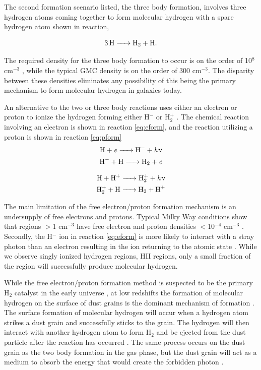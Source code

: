 The second formation scenario listed, the three body formation, involves three hydrogen atoms coming together to form molecular hydrogen with a spare hydrogen atom shown in reaction,

\begin{equation}\label{eq:3bod}
  \ce{3H -> H_2 + H}.
\end{equation}

The required density for the three body formation to occur is on the order of 10$^8$ cm$^{-3}$ \citep{palla1983,abel1997}, while the typical GMC density is on the order of 300 cm$^{-3}$.  The disparity between these densities eliminates any possibility of this being the primary mechanism to form molecular hydrogen in galaxies today. 

An alternative to the two or three body reactions uses either an electron or proton to ionize the hydrogen forming either H$^-$ or H$_2^+$ \citep{krumholz2014}.  The chemical reaction involving an electron is shown in reaction \ref{eq:eform}, and the reaction utilizing a proton is shown in reaction \ref{eq:pform}
\begin{equation}\label{eq:eform}
  \begin{split}
    \ce{H + \it{e} -> H^- + \it{h\nu}} \\
    \ce{H^- + H -> H_2 + \it{e}}
  \end{split}
\end{equation}

\begin{equation}\label{eq:pform}
  \begin{split}
    \ce{H + H^+ -> H^+_2 + \it{h\nu}} \\
    \ce{H^+_2 + H -> H_2 + H^+}
  \end{split}
\end{equation}

The main limitation of the free electron/proton formation mechanism is an undersupply of free electrons and protons.  Typical Milky Way conditions show that regions $>$1 cm$^{-3}$ have free electron and proton densities $<$10$^{-4}$ cm$^{-3}$ \citep{wolfire2003}.  Secondly, the H$^-$ ion in reaction \ref{eq:eform} is more likely to interact with a stray photon than an electron resulting in the ion returning to the atomic state \citep{glover2003}.  While we observe singly ionized hydrogen regions, HII regions, only a small fraction of the region will successfully produce molecular hydrogen.

While the free electron/proton formation method is suspected to be the primary H$_2$ catalyst in the early universe \citep{herbst2005}, at low redshifts the formation of molecular hydrogen on the surface of dust grains is the dominant mechanism of formation \citep{krumholz2014}.  The surface formation of molecular hydrogen will occur when a hydrogen atom strikes a dust grain and successfully sticks to the grain.  The hydrogen will then interact with another hydrogen atom to form H$_2$ and be ejected from the dust particle after the reaction has occurred \citep{pirronello1997}.  The same process occurs on the dust grain as the two body formation in the gas phase, but  the dust grain will act as a medium to absorb the energy that would create the forbidden photon \citep{krumholz2014}.

